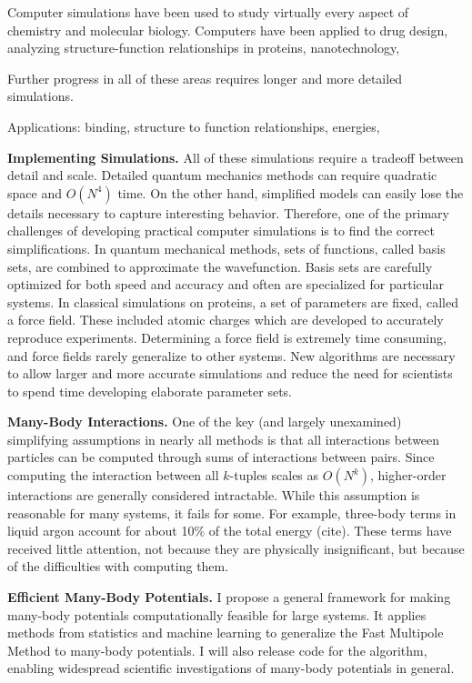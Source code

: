 \documentclass[twoside,leqno, 12pt]{article}
\begin{document}
Computer simulations have been used to study virtually every aspect of chemistry and molecular biology.  Computers have been applied to drug design, analyzing structure-function relationships in proteins, nanotechnology, 

Further progress in all of these areas requires longer and more detailed simulations.  

Applications: 
binding, structure to function relationships, energies, 

\textbf{Implementing Simulations.}  All of these simulations require a tradeoff between detail and scale.  Detailed quantum mechanics methods can require quadratic space and $O(N^4)$ time.  On the other hand, simplified models can easily lose the details necessary to capture interesting behavior.  Therefore, one of the primary challenges of developing practical computer simulations is to find the correct simplifications.  In quantum mechanical methods, sets of functions, called basis sets, are combined to approximate the wavefunction.  Basis sets are carefully optimized for both speed and accuracy and often are specialized for particular systems.  In classical simulations on proteins, a set of parameters are fixed, called a force field.  These included atomic charges which are developed to accurately reproduce experiments.  Determining a force field is extremely time consuming, and force fields rarely generalize to other systems.  New algorithms are necessary to allow larger and more accurate simulations and reduce the need for scientists to spend time developing elaborate parameter sets.  

\textbf{Many-Body Interactions.}  One of the key (and largely unexamined) simplifying assumptions in nearly all methods is that all interactions between particles can be computed through sums of interactions between pairs.  Since computing the interaction between all $k$-tuples scales as $O(N^k)$, higher-order interactions are generally considered intractable.  While this assumption is reasonable for many systems, it fails for some.  For example, three-body terms in liquid argon account for about 10\% of the total energy (cite).  These terms have received little attention, not because they are physically insignificant, but because of the difficulties with computing them.

\textbf{Efficient Many-Body Potentials.}  I propose a general framework for making many-body potentials computationally feasible for large systems.  It applies methods from statistics and machine learning to generalize the Fast Multipole Method to many-body potentials.  I will also release code for the algorithm, enabling widespread scientific investigations of many-body potentials in general.
\end{document}
